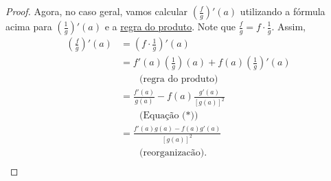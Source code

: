 \begin{proof}
	Agora, no caso geral, vamos calcular $\left(\frac{f}{g}\right)'(a)$ utilizando a fórmula acima para $\left(\frac{1}{g}\right)'(a)$ e a \href{teo_regra_do_produto_moodle.html}{regra do produto}. Note que $\frac{f}{g}=f\cdot\frac{1}{g}$. Assim,
	\begin{align*}
		\left(\frac{f}{g}\right)'(a)
			&=\left(f\cdot\frac{1}{g}\right)'(a)\\
			&=f'(a)\left(\frac{1}{g}\right)(a)+f(a)\left(\frac{1}{g}\right)'(a)\\
			&\qquad\text{(regra do produto)}\\
			&=\frac{f'(a)}{g(a)}-f(a)\frac{g'(a)}{[g(a)]^2}\\
			&\qquad\text{(Equação ($*$))}\\
			&=\frac{f'(a)g(a)-f(a)g'(a)}{[g(a)]^2}\\
			&\qquad\text{(reorganizacão).}\\
	\end{align*}
\end{proof}